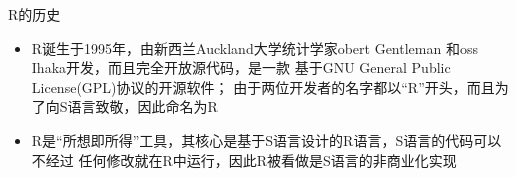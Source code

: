 \documentclass{beamerthemeMono}
\begin{document}
\begin{frame}[t]{\subsecname}{R的历史}

\begin{itemize}
\item<1-> R诞生于1995年，由新西兰Auckland大学统计学家obert Gentleman
        和oss Ihaka开发，而且完全开放源代码，是一款
        基于GNU General Public License(GPL)协议的开源软件；
由于两位开发者的名字都以“R”开头，而且为了向S语言致敬，因此命名为R
\item<2-> R是“所想即所得”工具，其核心是基于S语言设计的R语言，S语言的代码可以不经过
        任何修改就在R中运行，因此R被看做是S语言的非商业化实现  
\end{itemize}

\begin{overlayarea} {\textwidth}{\textheight}
    \begin{figure}\centering
      \captionsetup[subfigure]{labelformat=empty} 
       \vspace{1pt}
    \end{figure}
\end{overlayarea}

\end{frame}
\end{document}
